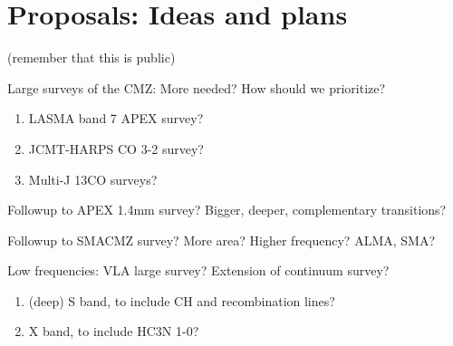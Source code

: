 \section{Proposals: Ideas and plans}
(remember that this is public)

Large surveys of the CMZ: More needed?  How should we prioritize?
\begin{enumerate}
\item LASMA band 7 APEX survey?
\item JCMT-HARPS CO 3-2 survey? 
\item Multi-J 13CO surveys?
\end{enumerate}

Followup to APEX 1.4mm survey?  Bigger, deeper, complementary transitions?

Followup to SMACMZ survey?  More area?  Higher frequency?  ALMA, SMA?

Low frequencies: VLA large survey?  Extension of \citet{Law2008b} continuum survey?
\begin{enumerate}
\item (deep) S band, to include CH and recombination lines?  
\item X band, to include HC3N 1-0?
\end{enumerate}